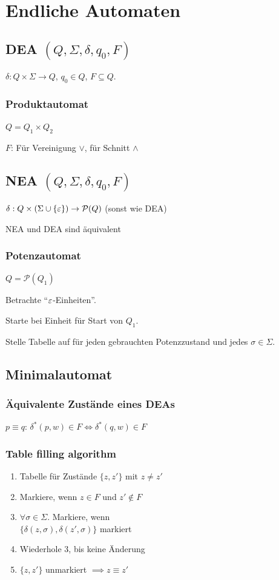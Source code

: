 \section*{Endliche Automaten}

\subsection*{DEA $(Q,\Sigma,\delta,q_0,F)$}
$\delta: Q \times \Sigma \to Q$, $q_0 \in Q$, $F \subseteq Q$.

\subsubsection*{Produktautomat}
$Q = Q_1 \times Q_2$

$F$: Für Vereinigung $\lor$, für Schnitt $\land$

\subsection*{NEA $(Q, \Sigma, \delta, q_0, F)$}
$\delta : Q \times (\Sigma \cup \{\varepsilon\}) \to \mathcal{P}(Q)$ (sonst wie DEA)

NEA und DEA sind äquivalent

\subsubsection*{Potenzautomat}
$Q = \mathcal{P}(Q_1)$

Betrachte \enquote{$\varepsilon$-Einheiten}.

Starte bei Einheit für Start von $Q_1$.

Stelle Tabelle auf für jeden gebrauchten Potenzzustand und jedes $\sigma \in \Sigma$.

\subsection*{Minimalautomat}

\subsubsection*{Äquivalente Zustände eines DEAs}
$p \equiv q$: $\delta^*(p,w) \in F \iff \delta^*(q,w) \in F$

\subsubsection*{Table filling algorithm}
\begin{enumerate}
	\item Tabelle für Zustände $\{z,z'\}$ mit $z \neq z'$
	\item Markiere, wenn $z\in F$ und $z' \notin F$
	\item $\forall \sigma\in\Sigma.$ Markiere, wenn\\$\{\delta(z,\sigma),\delta(z',\sigma)\}$ markiert
	\item Wiederhole 3, bis keine Änderung
	\item $\{z,z'\}$ unmarkiert $\implies z \equiv z'$
\end{enumerate}
